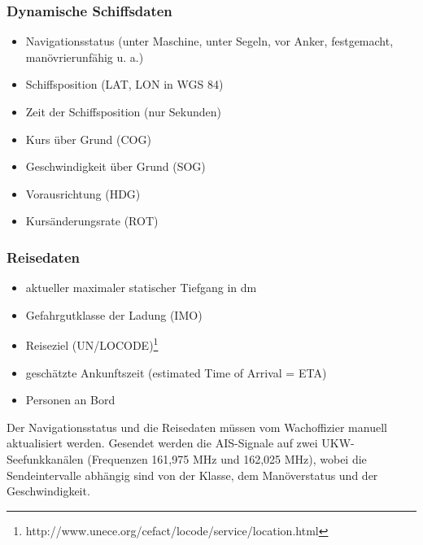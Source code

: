 \subsubsection{Dynamische Schiffsdaten} \label{Dynamische Schiffsdaten}
\begin{itemize}
\item Navigationsstatus (unter Maschine, unter Segeln, vor Anker, festgemacht, manövrierunfähig u. a.)
\item Schiffsposition (LAT, LON in WGS 84)
\item Zeit der Schiffsposition (nur Sekunden)
\item Kurs über Grund (COG)
\item Geschwindigkeit über Grund (SOG)
\item Vorausrichtung (HDG)
\item Kursänderungsrate (ROT)
\end{itemize}

\subsubsection{Reisedaten} \label{Reisedaten}
\begin{itemize}
\item aktueller maximaler statischer Tiefgang in dm
\item Gefahrgutklasse der Ladung (IMO)
\item Reiseziel (UN/LOCODE)\footnote{http://www.unece.org/cefact/locode/service/location.html}
\item geschätzte Ankunftszeit (estimated Time of Arrival = ETA)
\item Personen an Bord
\end{itemize}

Der Navigationsstatus und die Reisedaten müssen vom Wachoffizier manuell aktualisiert werden. Gesendet werden die AIS-Signale auf zwei UKW-Seefunkkanälen (Frequenzen 161,975 MHz und 162,025 MHz), wobei die Sendeintervalle abhängig sind von der Klasse, dem Manöverstatus und der Geschwindigkeit.

